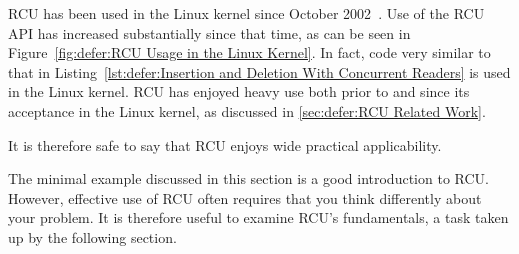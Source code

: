 RCU has been used in the Linux kernel since
October 2002~\cite{Torvalds2.5.43}.
Use of the RCU API has increased substantially since that time,
as can be seen in
Figure~\ref{fig:defer:RCU Usage in the Linux Kernel}.
In fact, code very similar to that in
Listing~\ref{lst:defer:Insertion and Deletion With Concurrent Readers}
is used in the Linux kernel.
RCU has enjoyed heavy use both prior to and since its acceptance
in the Linux kernel, as discussed in
\cref{sec:defer:RCU Related Work}.

It is therefore safe to say that RCU enjoys wide practical applicability.

The minimal example discussed in this section is a good introduction to RCU\@.
However, effective use of RCU often requires that you think differently
about your problem.
It is therefore useful to examine RCU's fundamentals, a task taken up
by the following section.
